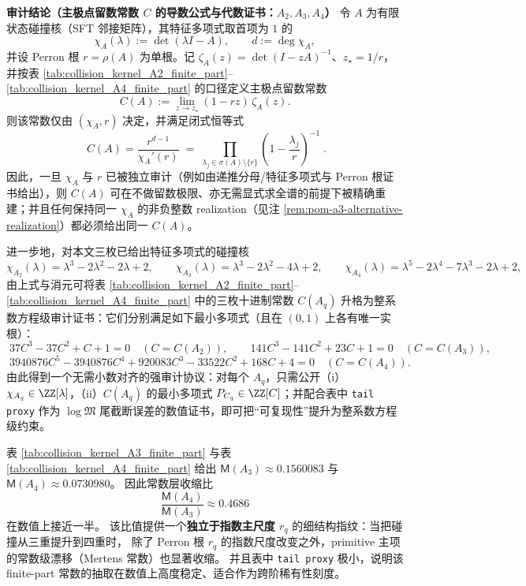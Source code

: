 


\par
\medskip\noindent\textbf{审计结论（主极点留数常数 \(C\) 的导数公式与代数证书：\(A_2,A_3,A_4\)）}
令 \(A\) 为有限状态碰撞核（SFT 邻接矩阵），其特征多项式取首项为 \(1\) 的
\[
\chi_A(\lambda):=\det(\lambda I-A),\qquad d:=\deg\chi_A,
\]
并设 Perron 根 \(r=\rho(A)\) 为单根。记
\(
\zeta_A(z)=\det(I-zA)^{-1}
\)、\(z_\star=1/r\)，并按表 \ref{tab:collision_kernel_A2_finite_part}--\ref{tab:collision_kernel_A4_finite_part} 的口径定义主极点留数常数
\[
C(A):=\lim_{z\to z_\star}(1-rz)\,\zeta_A(z).
\]
则该常数仅由 \((\chi_A,r)\) 决定，并满足闭式恒等式
\[
\boxed{\;
C(A)=\frac{r^{d-1}}{\chi_A'(r)}
\;=\;
\prod_{\lambda_j\in\sigma(A)\setminus\{r\}}\left(1-\frac{\lambda_j}{r}\right)^{-1}\; }.
\]
因此，一旦 \(\chi_A\) 与 \(r\) 已被独立审计（例如由递推分母/特征多项式与 Perron 根证书给出），则 \(C(A)\) 可在不做留数极限、亦无需显式求全谱的前提下被精确重建；并且任何保持同一 \(\chi_A\) 的非负整数 realization（见注 \ref{rem:pom-a3-alternative-realization}）都必须给出同一 \(C(A)\)。
\par
进一步地，对本文三枚已给出特征多项式的碰撞核
\[
\chi_{A_2}(\lambda)=\lambda^3-2\lambda^2-2\lambda+2,\qquad
\chi_{A_3}(\lambda)=\lambda^3-2\lambda^2-4\lambda+2,\qquad
\chi_{A_4}(\lambda)=\lambda^5-2\lambda^4-7\lambda^3-2\lambda+2,
\]
由上式与消元可将表 \ref{tab:collision_kernel_A2_finite_part}--\ref{tab:collision_kernel_A4_finite_part} 中的三枚十进制常数 \(C(A_q)\) 升格为整系数方程级审计证书：它们分别满足如下最小多项式（且在 \((0,1)\) 上各有唯一实根）：
\[
\boxed{\;
37C^3-37C^2+C+1=0\quad(C=C(A_2)),\qquad
141C^3-141C^2+23C+1=0\quad(C=C(A_3)),}
\]
\[
\boxed{\;
3940876C^5-3940876C^4+920083C^3-33522C^2+168C+4=0\quad(C=C(A_4)).}
\]
由此得到一个无需小数对齐的强审计协议：对每个 \(A_q\)，只需公开（i）\(\chi_{A_q}\in\ZZ[\lambda]\)，（ii）\(C(A_q)\) 的最小多项式 \(P_{C_q}\in\ZZ[C]\)；并配合表中 \texttt{tail proxy} 作为 \(\log\mathfrak{M}\) 尾截断误差的数值证书，即可把“可复现性”提升为整系数方程级约束。

\begin{remark}\label{rem:pom-collision-mertens-halving}
表 \ref{tab:collision_kernel_A3_finite_part} 与表 \ref{tab:collision_kernel_A4_finite_part} 给出
\(
\mathsf{M}(A_3)\approx 0.1560083
\)
与
\(
\mathsf{M}(A_4)\approx 0.0730980
\)。
因此常数层收缩比
\[
\boxed{\;
\frac{\mathsf{M}(A_4)}{\mathsf{M}(A_3)}\approx 0.4686\;}
\]
 在数值上接近一半。
该比值提供一个\textbf{独立于指数主尺度 \(r_q\)} 的细结构指纹：当把碰撞从三重提升到四重时，
除了 Perron 根 \(r_q\) 的指数尺度改变之外，primitive 主项的常数级漂移（Mertens 常数）也显著收缩。
并且表中 \texttt{tail proxy} 极小，说明该 finite-part 常数的抽取在数值上高度稳定、适合作为跨阶稀有性刻度。
\end{remark}

